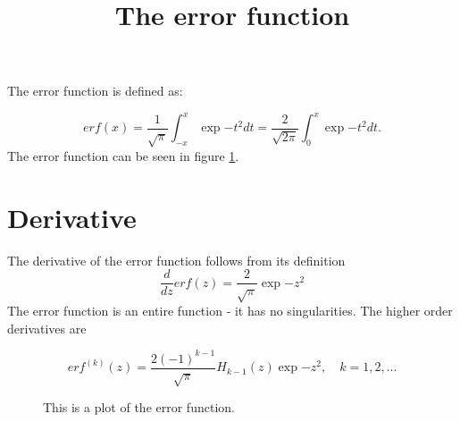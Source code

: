 \documentclass[onecolumn]{article}
\begin{document}
\title{The error function}
\maketitle
 
The error function is defined as:

\begin{equation}
erf(x)=\frac{1}{\sqrt{\pi}} \int^{x}_{-x} \exp{-t^2} dt=\frac{2}{\sqrt{2\pi}}\int_0^x \exp{-t^2} dt.
\end{equation}
The error function can be seen in figure \ref{1f}.

\section{Derivative}
The derivative of the error function follows from its definition
\begin{equation}
\frac{d}{dz}erf(z)=\frac{2}{\sqrt{\pi}}\exp{-z^2}
\end{equation}
The error function is an entire function - it has no singularities. The higher order derivatives are

\begin{equation}
erf^{(k)}(z)=\frac{2(-1)^{k-1}}{\sqrt{\pi}} H_{k-1}(z)\exp{-z^2}, \quad k=1,2,...
\end{equation}

\begin{figure}[h]

\label{1f}
\caption{This is a plot of the error function.}
\end{figure}
\end{document}

